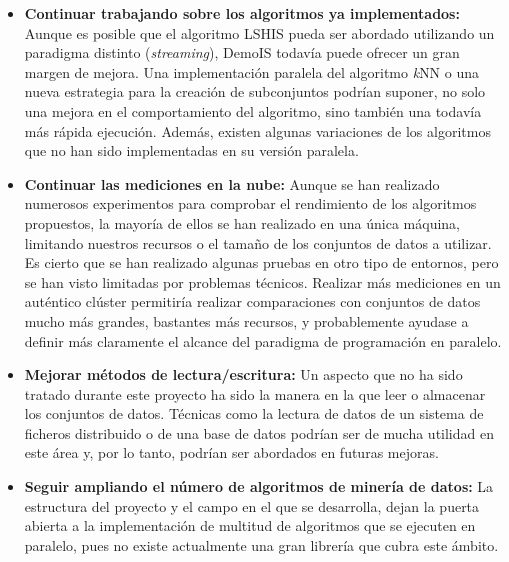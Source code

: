 \begin{itemize}
\item \textbf{Continuar trabajando sobre los algoritmos ya implementados:} Aunque es posible que el algoritmo LSHIS pueda ser abordado utilizando un paradigma distinto (\textit{streaming}), DemoIS todavía puede ofrecer un gran margen de mejora. Una implementación paralela del algoritmo \textit{k}NN o una nueva estrategia para la creación de subconjuntos podrían suponer, no solo una mejora en el comportamiento del algoritmo, sino también una todavía más rápida ejecución. Además, existen algunas variaciones de los algoritmos que no han sido implementadas en su versión paralela.

\item \textbf{Continuar las mediciones en la nube:} Aunque se han realizado numerosos experimentos para comprobar el rendimiento de los algoritmos propuestos, la mayoría de ellos se han realizado en una única máquina, limitando nuestros recursos o el tamaño de los conjuntos de datos a utilizar. Es cierto que se han realizado algunas pruebas en otro tipo de entornos, pero se han visto limitadas por problemas técnicos. Realizar más mediciones en un auténtico clúster permitiría realizar comparaciones con conjuntos de datos mucho más grandes, bastantes más recursos, y probablemente ayudase a definir más claramente el alcance del paradigma de programación en paralelo.

\item \textbf{Mejorar métodos de lectura/escritura:} Un aspecto que no ha sido tratado durante este proyecto ha sido la manera en la que leer o almacenar los conjuntos de datos. Técnicas como la lectura de datos de un sistema de ficheros distribuido o de una base de datos podrían ser de mucha utilidad en este área y, por lo tanto, podrían ser abordados en futuras mejoras.

\item \textbf{Seguir ampliando el número de algoritmos de minería de datos:} La estructura del proyecto y el campo en el que se desarrolla, dejan la puerta abierta a la implementación de multitud de algoritmos que se ejecuten en paralelo, pues no existe actualmente una gran librería que cubra este ámbito.


\end{itemize}



